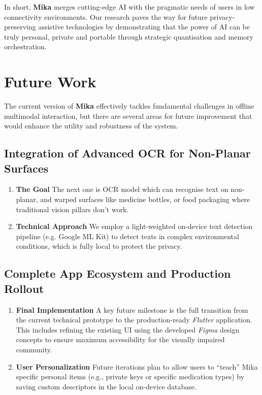 \documentclass[12pt,a4paper]{report}
\begin{document}
\vspace{0.4cm}
 
\noindent  In short, \textbf{Mika} merges cutting-edge AI with the pragmatic needs of users in low connectivity environments. Our research paves the way for future privacy-preserving assistive technologies by demonstrating that the power of AI can be truly personal, private and portable through strategic quantisation and memory orchestration.
\vspace{0.2 cm}
 
\section{Future Work}
\noindent The current version of \textbf{Mika} effectively tackles fundamental challenges in offline multimodal interaction, but there are several areas for future improvement that would enhance the utility and robustness of the system.
 
    \subsection{Integration of Advanced OCR for Non-Planar Surfaces}
    \begin{enumerate}
        \item \textbf{The Goal} The next one is OCR model which can recognise text on non-planar, and warped surfaces like medicine bottles, or food packaging where traditional vision pillars don't work.
        \item \textbf{Technical Approach} We employ a light-weighted on-device text detection pipeline (e.g. Google ML Kit) to detect texts in complex environmental conditions, which is fully local to protect the privacy.
    \end{enumerate}
 
    \subsection{Complete App Ecosystem and Production Rollout}
    \begin{enumerate}
        \item \textbf{Final Implementation} A key future milestone is the full transition from the current technical prototype to the production-ready \textit{Flutter} application. This includes refining the existing UI using the developed \textit{Figma} design concepts to ensure maximum accessibility for the visually impaired community.
        \item \textbf{User Personalization} Future iterations plan to allow users to ``teach'' Mika specific personal items (e.g., private keys or specific medication types) by saving custom descriptors in the local on-device database.
    \end{enumerate}
 
\end{document}
